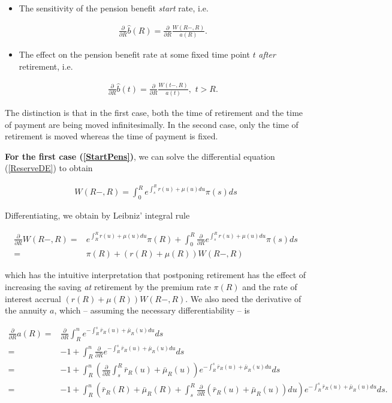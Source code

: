 \documentclass{article}
\newcommand{\1}[1]{\mathbbm{1}_{\left\lbrace #1 \right\rbrace}}
\theoremstyle{break}
\theoremstyle{remark}
\numberwithin{equation}{section}
\begin{document}
\begin{itemize}
	\item The sensitivity of the pension benefit \textit{start} rate, i.e.
	
	\begin{align} \label{StartPens}
		\frac{\partial}{\partial R} \hat{b}(R) = \frac{\partial}{\partial R} \frac{W(R-,R)}{a(R)}.
	\end{align}

	\item The effect on the pension benefit rate at some fixed time point $t$ \textit{after} retirement, i.e.
	
	\begin{align} \label{LaterPens}
		\frac{\partial}{\partial R} \hat{b}(t) = \frac{\partial}{\partial R} \frac{W(t-,R)}{a(t)}, \, \, t > R.
	\end{align}
	
\end{itemize}

The distinction is that in the first case, both the time of retirement and the time of payment are being moved infinitesimally. In the second case, only the time of retirement is moved whereas the time of payment is fixed.

\textbf{For the first case (\ref{StartPens})}, we can solve the differential equation (\ref{ReserveDE}) to obtain

\begin{align} \label{ReserveAtRetirement}
	W(R-,R) = \int_0^R e^{\int_s^R r(u) + \mu(u) du} \pi(s) ds
\end{align}

Differentiating, we obtain by Leibniz' integral rule

\begin{align*}
	\frac{\partial}{\partial R} W(R-,R) =& e^{\int_R^R r(u) + \mu(u) du} \pi(R) + \int_0^R \frac{\partial}{\partial R} e^{\int_s^R r(u) + \mu(u) du} \pi(s) ds \\
	=& \pi(R) + \left(r(R) + \mu(R)\right) W(R-,R)
\end{align*}

which has the intuitive interpretation that postponing retirement has the effect of increasing the saving \textit{at} retirement by the premium rate $\pi(R)$ and the rate of interest accrual $\left(r(R) + \mu(R)\right) W(R-,R)$. We also need the derivative of the annuity $a$, which  -- assuming the necessary differentiability -- is

\begin{align*}
	\frac{\partial}{\partial R} a(R) =& \frac{\partial}{\partial R} \int_R^n e^{-\int_R^s \bar{r}_R(u) + \bar{\mu}_R(u) du} ds \\
	=& - 1 + \int_R^n \frac{\partial}{\partial R} e^{-\int_R^s \bar{r}_R(u) + \bar{\mu}_R(u) du} ds \\
	=& - 1 + \int_R^n \left( \frac{\partial}{\partial R} \int_s^R \bar{r}_R(u) + \bar{\mu}_R(u) \right) e^{-\int_R^s \bar{r}_R(u) + \bar{\mu}_R(u) du} ds \\
	=& - 1 + \int_R^n \left( \bar{r}_R(R) + \bar{\mu}_R(R) + \int_s^R 	\frac{\partial}{\partial R} \left(\bar{r}_R(u)+\bar{\mu}_R(u)\right) du \right) e^{-\int_R^s \bar{r}_R(u) + \bar{\mu}_R(u) du} ds.
\end{align*}
\end{document}
